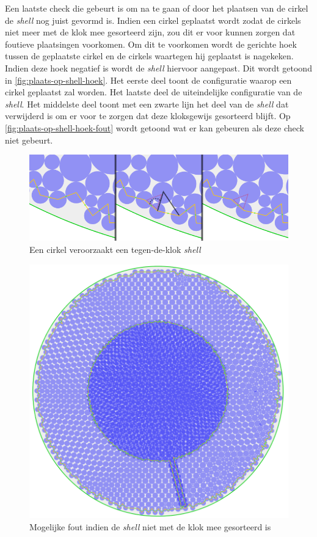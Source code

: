 \documentclass[12pt,a4paper,oneside]{book}
\begin{document}
Een laatste check die gebeurt is om na te gaan of door het plaatsen van de cirkel de \textit{shell} nog juist gevormd is.
Indien een cirkel geplaatst wordt zodat de cirkels niet meer met de klok mee gesorteerd zijn, zou dit er voor kunnen zorgen dat foutieve plaatsingen voorkomen.
Om dit te voorkomen wordt de gerichte hoek tussen de geplaatste cirkel en de cirkels waartegen hij geplaatst is nagekeken.
Indien deze hoek negatief is wordt de \textit{shell} hiervoor aangepast.
Dit wordt getoond in \autoref{fig:plaats-op-shell-hoek}.
Het eerste deel toont de configuratie waarop een cirkel geplaatst zal worden.
Het laatste deel de uiteindelijke configuratie van de \textit{shell}.
Het middelste deel toont met een zwarte lijn het deel van de \textit{shell} dat verwijderd is om er voor te zorgen dat deze kloksgewijs gesorteerd blijft.
Op \autoref{fig:plaats-op-shell-hoek-fout}  wordt getoond wat er kan gebeuren als deze check niet gebeurt.

\begin{figure}
  \centering
  \includegraphics[width=1.0\textwidth]{plaats-op-shell-hoek.png}
  \caption{Een cirkel veroorzaakt een tegen-de-klok \textit{shell}} \label{fig:plaats-op-shell-hoek} 
\end{figure}

\begin{figure}
  \centering
  \includegraphics[width=.65\textwidth]{plaats-op-shell-hoek-fout.png}
  \caption{Mogelijke fout indien de \textit{shell} niet met de klok mee gesorteerd is} \label{fig:plaats-op-shell-hoek-fout} 
\end{figure}
\end{document}

